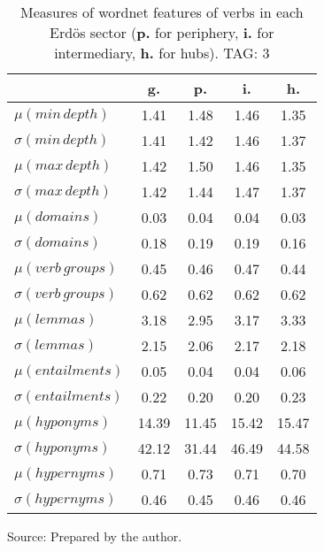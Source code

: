 \begin{table}[h!]
\begin{center}
\caption{Measures of wordnet features of verbs in each Erd\"os sector ({{\bf p.}} for periphery, {{\bf i.}} for intermediary, {{\bf h.}} for hubs). TAG: 3}
	\label{tab:wnv}
\begin{tabular}{| l || c | c | c | c |}\hline
 & {\bf g.} & {\bf p.} & {\bf i.} & {\bf h.} \\\hline\hline
$\mu(min\,depth)$ & 1.41  & 1.48  & 1.46  & 1.35 \\
$\sigma(min\,depth)$ & 1.41  & 1.42  & 1.46  & 1.37 \\\hline
$\mu(max\,depth)$ & 1.42  & 1.50  & 1.46  & 1.35 \\
$\sigma(max\,depth)$ & 1.42  & 1.44  & 1.47  & 1.37 \\\hline
$\mu(domains)$ & 0.03  & 0.04  & 0.04  & 0.03 \\
$\sigma(domains)$ & 0.18  & 0.19  & 0.19  & 0.16 \\\hline
$\mu(verb\,groups)$ & 0.45  & 0.46  & 0.47  & 0.44 \\
$\sigma(verb\,groups)$ & 0.62  & 0.62  & 0.62  & 0.62 \\\hline
$\mu(lemmas)$ & 3.18  & 2.95  & 3.17  & 3.33 \\
$\sigma(lemmas)$ & 2.15  & 2.06  & 2.17  & 2.18 \\\hline
$\mu(entailments)$ & 0.05  & 0.04  & 0.04  & 0.06 \\
$\sigma(entailments)$ & 0.22  & 0.20  & 0.20  & 0.23 \\\hline
$\mu(hyponyms)$ & 14.39  & 11.45  & 15.42  & 15.47 \\
$\sigma(hyponyms)$ & 42.12  & 31.44  & 46.49  & 44.58 \\\hline
$\mu(hypernyms)$ & 0.71  & 0.73  & 0.71  & 0.70 \\
$\sigma(hypernyms)$ & 0.46  & 0.45  & 0.46  & 0.46 \\\hline
\end{tabular}
\begin{flushleft}
		Source: Prepared by the author.\
\end{flushleft}
\end{center}
\end{table}
